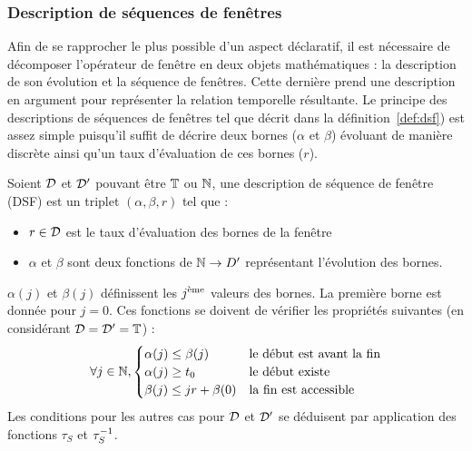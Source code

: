 %
\subsubsection{Description de séquences de fenêtres}
Afin de se rapprocher le plus possible d'un aspect déclaratif, il est nécessaire de décomposer l'opérateur de fenêtre en deux objets mathématiques : la description de son évolution et la séquence de fenêtres. Cette dernière prend une description en argument pour représenter la relation temporelle résultante. Le principe des descriptions de séquences de fenêtres tel que décrit dans la définition~\ref{def:dsf}) est assez simple puisqu'il suffit de décrire deux bornes ($\alpha$ et $\beta$) évoluant de manière discrète ainsi qu'un taux d'évaluation de ces bornes ($r$).

\begin{defi}\label{def:dsf}
    Soient $\mathcal{D}$ et $\mathcal{D}'$ pouvant être $\mathbb{T}$ ou $\mathbb{N}$, une description de séquence de fenêtre (DSF) est un triplet $(\alpha,\beta,r)$ tel que :
\begin{itemize}
    \item $r \in \mathcal{D}$ est le taux d'évaluation des bornes de la fenêtre
    \item $\alpha$ et $\beta$ sont deux fonctions de $\mathbb{N}\to D'$ représentant l'évolution des bornes.
\end{itemize}

$\alpha(j)$ et $\beta(j)$ définissent les $j^{\textrm{\`{e}me}}$ valeurs des bornes. La première borne est donnée pour $j=0$. Ces fonctions se doivent de vérifier les propriétés suivantes (en considérant $\mathcal{D}=\mathcal{D}'=\mathbb{T}$) :
$$\forall j \in \mathbb{N}, \begin{cases} \alpha(j) \leq \beta(j) & \textrm{le début est avant la fin}\\ \alpha(j) \geq t_0 & \textrm{le début existe} \\ \beta(j) \leq jr + \beta(0) & \textrm{la fin est accessible} \end{cases}$$
    Les conditions pour les autres cas pour $\mathcal{D}$ et $\mathcal{D}'$ se déduisent par application des fonctions $\tau_S$ et $\tau^{-1}_S$.
\end{defi}

